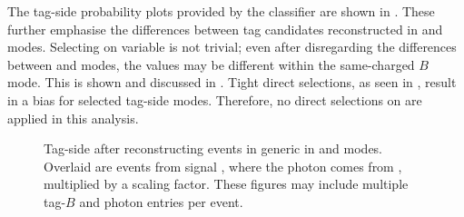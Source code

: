 The tag-side probability plots provided by the \FEI classifier are shown in .
These further emphasise the differences between tag candidates reconstructed in \feiBp and \feiBz modes.
Selecting on \feiProb variable is not trivial;
even after disregarding the differences between \feiBp and \feiBz modes, 
the \feiProb values may be different within the same-charged $B$ mode.
This is shown and discussed in .
Tight direct selections, as seen in , result in a bias for selected tag-side modes.
Therefore, no direct selections on \feiProb are applied in this analysis.

\begin{figure}[htbp!]
    \centering
    \caption{\label{fig:sigprob_after_reco} Tag-side \feiProb after reconstructing \BtoXsgamma events in generic \MC in \feiBp and \feiBz modes.
    Overlaid are events from signal \MC, where the photon comes from \BtoXsgamma, multiplied by a scaling factor.
    These figures may include multiple tag-$B$ and photon entries per event.
    }
\end{figure}

